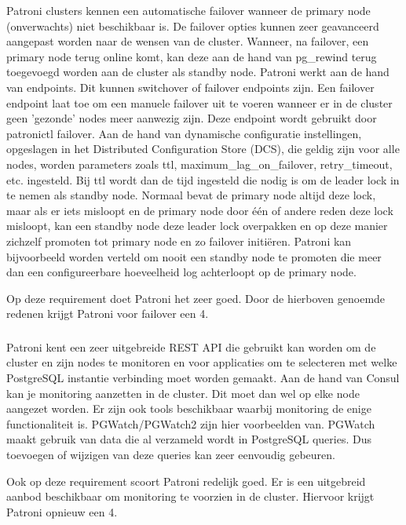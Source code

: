 Patroni clusters kennen een automatische failover wanneer de primary node (onverwachts) niet beschikbaar is. De failover opties kunnen zeer geavanceerd aangepast worden naar de wensen van de cluster. Wanneer, na failover, een primary node terug online komt, kan deze aan de hand van pg\_rewind terug toegevoegd worden aan de cluster als standby node. Patroni werkt aan de hand van endpoints. Dit kunnen switchover of failover endpoints zijn. Een failover endpoint laat toe om een manuele failover uit te voeren wanneer er in de cluster geen 'gezonde' nodes meer aanwezig zijn. Deze endpoint wordt gebruikt door patronictl failover.
Aan de hand van dynamische configuratie instellingen, opgeslagen in het Distributed Configuration Store (DCS), die geldig zijn voor alle nodes, worden parameters zoals ttl, maximum\_lag\_on\_failover, retry\_timeout, etc. ingesteld. Bij ttl wordt dan de tijd ingesteld die nodig is om de leader lock in te nemen als standby node. Normaal bevat de primary node altijd deze lock, maar als er iets misloopt en de primary node door één of andere reden deze lock misloopt, kan een standby node deze leader lock overpakken en op deze manier zichzelf promoten tot primary node en zo failover initiëren. Patroni kan bijvoorbeeld worden verteld om nooit een standby node te promoten die meer dan een configureerbare hoeveelheid log achterloopt op de primary node.

Op deze requirement doet Patroni het zeer goed. Door de hierboven genoemde redenen krijgt Patroni voor failover een 4.

\subsubsection{}
\label{subsubsec:Monitoring}

Patroni kent een zeer uitgebreide REST API die gebruikt kan worden om de cluster en zijn nodes te monitoren en voor applicaties om te selecteren met welke PostgreSQL instantie verbinding moet worden gemaakt. Aan de hand van Consul kan je monitoring aanzetten in de cluster. Dit moet dan wel op elke node aangezet worden.
Er zijn ook tools beschikbaar waarbij monitoring de enige functionaliteit is. PGWatch/PGWatch2 zijn hier voorbeelden van. PGWatch maakt gebruik van data die al verzameld wordt in PostgreSQL queries. Dus toevoegen of wijzigen van deze queries kan zeer eenvoudig gebeuren.

Ook op deze requirement scoort Patroni redelijk goed. Er is een uitgebreid aanbod beschikbaar om monitoring te voorzien in de cluster. Hiervoor krijgt Patroni opnieuw een 4.

